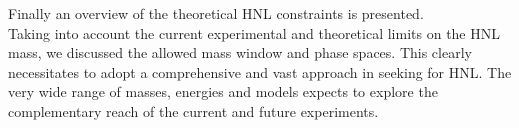 Finally an overview of the theoretical HNL
constraints is presented.\\
Taking into account 
the current experimental and theoretical limits on the HNL
mass, we discussed the allowed mass window and phase spaces. This clearly necessitates to adopt a
comprehensive and vast approach in seeking for HNL.
The very wide range of masses, energies and models expects to
explore the complementary reach of the current and future experiments.\\











